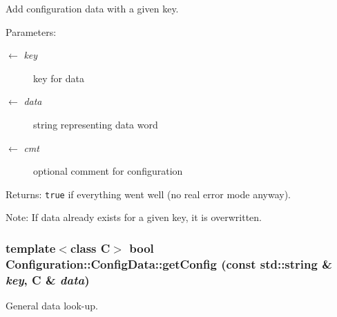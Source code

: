 Add configuration data with a given key. 

\begin{Desc}
\item[Parameters:]
\begin{description}
\item[\mbox{$\leftarrow$} {\em key}]key for data \item[\mbox{$\leftarrow$} {\em data}]string representing data word \item[\mbox{$\leftarrow$} {\em cmt}]optional comment for configuration\end{description}
\end{Desc}
\begin{Desc}
\item[Returns:]{\tt true} if everything went well (no real error mode anyway).\end{Desc}
\begin{Desc}
\item[Note:]If data already exists for a given key, it is overwritten. \end{Desc}
\hypertarget{classConfiguration_1_1ConfigData_6d0a1579cc1c75a659a43b1644977b57}{
\subsubsection[getConfig]{\setlength{\rightskip}{0pt plus 5cm}template$<$class C$>$ bool Configuration::Config\-Data::get\-Config (const std::string \& {\em key}, C \& {\em data})}}
\label{classConfiguration_1_1ConfigData_6d0a1579cc1c75a659a43b1644977b57}


General data look-up. 

